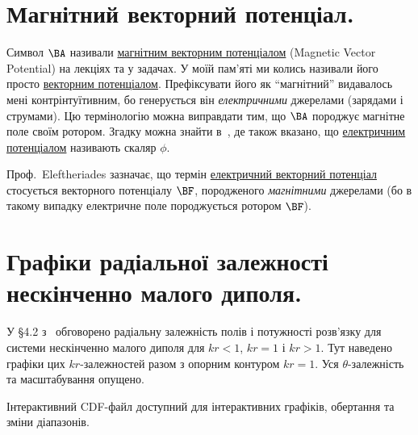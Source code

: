 %
%
\label{chap:chapter4Notes}

\section{Магнітний векторний потенціал.}
Символ \(\BA\) називали \underline{магнітним векторним потенціалом} (Magnetic Vector Potential) на лекціях та у задачах.
У моїй пам'яті ми колись називали його просто \underline{векторним потенціалом}.
Префіксувати його як ``магнітний'' видавалось мені контр\-інтуїтивним, бо генерується він \emph{електричними} джерелами (зарядами і струмами).
Цю термінологію можна виправдати тим, що \(\BA\) породжує магнітне поле своїм ротором.
Згадку можна знайти в~\citep{wiki:magneticPotential}, де також вказано, що \underline{електричним потенціалом} називають скаляр \(\phi\).

Проф.~Eleftheriades зазначає, що термін \underline{електричний векторний потенціал} стосується векторного потенціалу \(\BF\), породженого \emph{магнітними} джерелами (бо в такому випадку електричне поле породжується ротором \(\BF\)).

\section{Графіки радіальної залежності нескінченно малого диполя.}
У §4.2 з~\citep{balanis2005antenna} обговорено радіальну залежність полів і потужності розв'язку для системи нескінченно малого диполя для \(kr < 1\), \(kr = 1\) і \(kr > 1\). Тут наведено графіки цих \(kr\)-залежностей разом з опорним контуром \(kr = 1\). Уся \(\theta\)-залежність та масштабування опущено.

Інтерактивний CDF-файл
доступний для інтерактивних графіків, обертання та зміни діапазонів.

